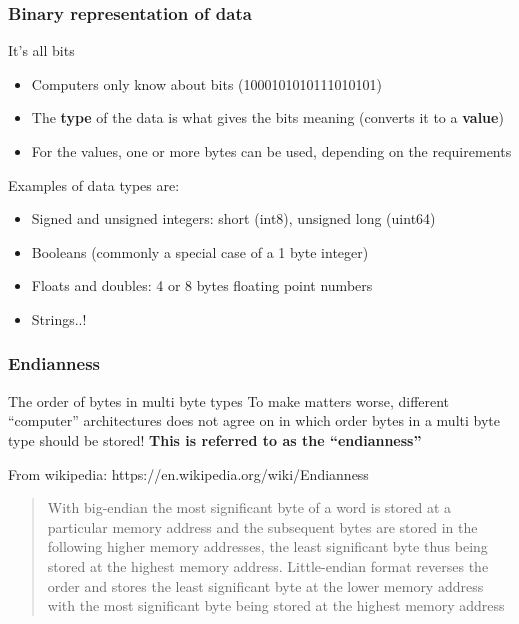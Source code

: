\documentclass{beamer}
\begin{document}
\begin{frame}
  \frametitle{Binary representation of data}
  \begin{block}{It's all bits}
    \begin{itemize}
    \item Computers only know about bits (1000101010111010101)
    \item The \textbf{type} of the data is what gives the bits meaning (converts it to a \textbf{value})
    \item For the values, one or more bytes can be used, depending on the requirements
    \end{itemize}
  \end{block}
  Examples of data types are:
  \begin{itemize}
  \item Signed and unsigned integers: short (int8), unsigned long (uint64)
  \item Booleans (commonly a special case of a 1 byte integer)
  \item Floats and doubles: 4 or 8 bytes floating point numbers
  \item Strings..!
  \end{itemize}
\end{frame}

\begin{frame}[fragile]
  \frametitle{Endianness}
  \begin{alertblock}{The order of bytes in multi byte types}
    To make matters worse, different ``computer'' architectures does
    not agree on in which order bytes in a multi byte type should be
    stored!\newline
    \newline
    \textbf{This is referred to as the ``endianness''}
  \end{alertblock}
  From wikipedia: https://en.wikipedia.org/wiki/Endianness\newline
  \begin{quotation}
    With big-endian the most significant byte of a word is stored at a
    particular memory address and the subsequent bytes are stored in
    the following higher memory addresses, the least significant byte
    thus being stored at the highest memory address. Little-endian
    format reverses the order and stores the least significant byte at
    the lower memory address with the most significant byte being
    stored at the highest memory address
  \end{quotation}
\end{frame}
\end{document}
